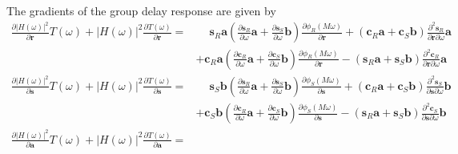 \documentclass[a4paper,twoside,10pt,english]{report}
\begin{document}
The gradients of the group delay response are given by
\begin{align*}
\frac{\partial\left|H\left(\omega\right)\right|^{2}}{\partial\boldsymbol{r}}
T\left(\omega\right)+\left|H\left(\omega\right)\right|^{2}
\frac{\partial T\left(\omega\right)}{\partial\boldsymbol{r}} =& 
\phantom{+}\boldsymbol{s}_{R}\boldsymbol{a}
\left(\frac{\partial\boldsymbol{s}_{R}}{\partial\omega}\boldsymbol{a}+
      \frac{\partial\boldsymbol{s}_{S}}{\partial\omega}\boldsymbol{b}\right)
\frac{\partial\phi_{R}\left(M\omega\right)}{\partial\boldsymbol{r}}
+\left(\boldsymbol{c}_{R}\boldsymbol{a}+
      \boldsymbol{c}_{S}\boldsymbol{b}\right)
\frac{\partial^{2}\boldsymbol{s}_{R}}{\partial\boldsymbol{r}\partial\omega}
\boldsymbol{a}\\
&+\boldsymbol{c}_{R}\boldsymbol{a}
\left(\frac{\partial\boldsymbol{c}_{R}}{\partial\omega}\boldsymbol{a}+
      \frac{\partial\boldsymbol{c}_{S}}{\partial\omega}\boldsymbol{b}\right)
\frac{\partial\phi_{R}\left(M\omega\right)}{\partial\boldsymbol{r}}
-\left(\boldsymbol{s}_{R}\boldsymbol{a}+
      \boldsymbol{s}_{S}\boldsymbol{b}\right)
\frac{\partial^{2}\boldsymbol{c}_{R}}{\partial\boldsymbol{r}\partial\omega}
\boldsymbol{a} \\
\frac{\partial\left|H\left(\omega\right)\right|^{2}}{\partial\boldsymbol{s}}
T\left(\omega\right)+\left|H\left(\omega\right)\right|^{2}
\frac{\partial T\left(\omega\right)}{\partial\boldsymbol{s}} =&
\phantom{+}\boldsymbol{s}_{S}\boldsymbol{b}
\left(\frac{\partial\boldsymbol{s}_{R}}{\partial\omega}\boldsymbol{a}+
      \frac{\partial\boldsymbol{s}_{S}}{\partial\omega}\boldsymbol{b}\right)
\frac{\partial\phi_{S}\left(M\omega\right)}{\partial\boldsymbol{s}}
+\left(\boldsymbol{c}_{R}\boldsymbol{a}+
      \boldsymbol{c}_{S}\boldsymbol{b}\right)
\frac{\partial^{2}\boldsymbol{s}_{S}}{\partial\boldsymbol{s}\partial\omega}
\boldsymbol{b}\\
&+\boldsymbol{c}_{S}\boldsymbol{b}
\left(\frac{\partial\boldsymbol{c}_{R}}{\partial\omega}\boldsymbol{a}+
      \frac{\partial\boldsymbol{c}_{S}}{\partial\omega}\boldsymbol{b}\right)
\frac{\partial\phi_{S}\left(M\omega\right)}{\partial\boldsymbol{s}}
-\left(\boldsymbol{s}_{R}\boldsymbol{a}+
      \boldsymbol{s}_{S}\boldsymbol{b}\right)
\frac{\partial^{2}\boldsymbol{c}_{S}}{\partial\boldsymbol{s}\partial\omega}
\boldsymbol{b} \\
\frac{\partial\left|H\left(\omega\right)\right|^{2}}{\partial\boldsymbol{a}}
T\left(\omega\right)+\left|H\left(\omega\right)\right|^{2}
\frac{\partial T\left(\omega\right)}{\partial\boldsymbol{a}} =& 

\end{align*}
\end{document}
